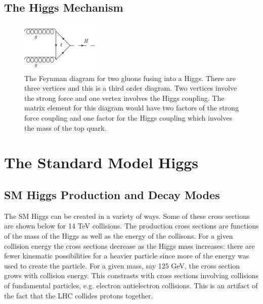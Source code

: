 
\subsection{The Higgs Mechanism}

\begin{figure}[h!]
  \centering
  \includegraphics[width=1.5in]{images/ggf.png}
  \caption
   {The Feynman diagram for two gluons fusing into a Higgs. There are three vertices and this is a third order diagram. Two vertices involve the strong force and one vertex involves the Higgs coupling. The matrix element for this diagram would have two factors of the strong force coupling and one factor for the Higgs coupling which involves the mass of the top quark.}
  \label{fig:feynggf}
\end{figure}

\section{The Standard Model Higgs}


\subsection{SM Higgs Production and Decay Modes}

The SM Higgs can be created in a variety of ways. Some of these cross sections are shown below for 14 TeV collisions. The production cross sections are functions of the mass of the Higgs as well as the energy of the collisons. For a given collision energy the cross sections decrease as the Higgs mass increases: there are fewer kinematic possibilities for a heavier particle since more of the energy was used to create the particle. For a given mass, say 125 GeV, the cross section grows with collision energy. This constrasts with cross sections involving collisions of fundamental particles, e.g. electron antielectron collisions. This is an artifact of the fact that the LHC collides protons together. 

